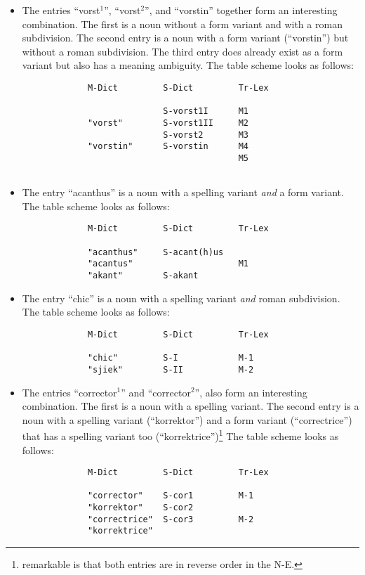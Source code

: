 \begin{itemize}
  \item The entries ``vorst$^1$'', ``vorst$^2$'',
        and ``vorstin'' together form an interesting combination. The first is
        a noun without a form variant and with a roman subdivision. The second
        entry is a noun with a form variant (``vorstin'') but without a roman 
        subdivision. The third entry does already exist as a form variant but
        also has a meaning ambiguity. The table scheme looks as follows:\\
        \begin{verbatim}
             M-Dict         S-Dict         Tr-Lex

                            S-vorst1I      M1
             "vorst"        S-vorst1II     M2
                            S-vorst2       M3
             "vorstin"      S-vorstin      M4
                                           M5
             
        \end{verbatim}
  \item The entry ``acanthus'' is 
        a noun with a spelling variant {\em and} a form variant. 
        The table scheme looks as follows:\\
        \begin{verbatim}
             M-Dict         S-Dict         Tr-Lex

             "acanthus"     S-acant(h)us
             "acantus"                     M1
             "akant"        S-akant
        \end{verbatim}
  \item The entry ``chic'' is 
        a noun with a spelling variant {\em and} roman subdivision. 
        The table scheme looks as follows:\\
        \begin{verbatim}
             M-Dict         S-Dict         Tr-Lex

             "chic"         S-I            M-1
             "sjiek"        S-II           M-2
        \end{verbatim}
  \item The entries ``corrector$^1$'' and ``corrector$^2$'',
        also form an interesting combination. The first is
        a noun with a spelling variant. The second entry is a noun with a 
        spelling variant (``korrektor'') and a form variant (``correctrice'') 
        that has a spelling variant too (``korrektrice'')\footnote{remarkable 
        is that both entries are in reverse order in the N-E.}
        The table scheme looks as follows:\\
        \begin{verbatim}
             M-Dict         S-Dict         Tr-Lex

             "corrector"    S-cor1         M-1
             "korrektor"    S-cor2         
             "correctrice"  S-cor3         M-2
             "korrektrice"  
        \end{verbatim}
\end{itemize}

